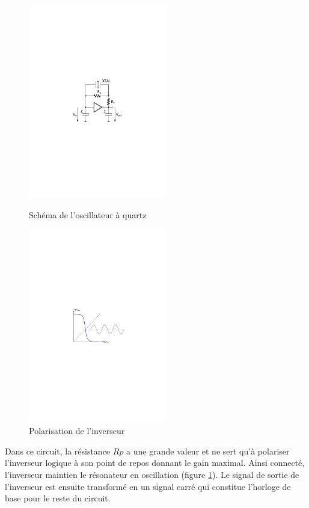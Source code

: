 \begin{figure}[!htb]
    \centering
    \begin{minipage}{.5\textwidth}
        \centering
        \includegraphics[width=6cm]{./Figures/Chap6_Horloges/Osc_XTAL_1.pdf}
  \caption{Schéma de l'oscillateur à quartz}
        \label{fig:Osc_XTAL_1}
    \end{minipage}%
    \begin{minipage}{0.5\textwidth}
        \centering
        \includegraphics[width=6cm]{./Figures/Chap6_Horloges/XTAL_Pol.pdf}
        \caption{Polarisation de l'inverseur}
        \label{fig:XTAL_Pol}
    \end{minipage}
\end{figure}

Dans ce circuit, la résistance $R{p}$ a une grande valeur et ne sert qu'à polariser l'inverseur logique à son point de repos donnant le gain maximal. Ainsi connecté, l'inverseur maintien le résonateur en oscillation (figure \ref{fig:XTAL_Pol}). Le signal de sortie de l'inverseur est ensuite transformé en un signal carré qui constitue l'horloge de base pour le reste du circuit.

